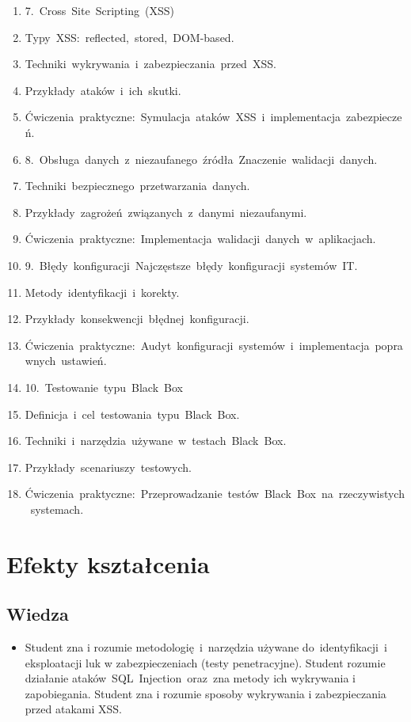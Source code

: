\documentclass[12pt, a4paper]{article}
\begin{document}
\begin{enumerate}
  \item 7. Cross Site Scripting (XSS)
  \item Typy XSS: reflected, stored, DOM-based.
  \item Techniki wykrywania i zabezpieczania przed XSS.
  \item Przykłady ataków i ich skutki.
  \item Ćwiczenia praktyczne: Symulacja ataków XSS i implementacja zabezpieczeń.
  \item 8. Obsługa danych z niezaufanego źródła Znaczenie walidacji danych.
  \item Techniki bezpiecznego przetwarzania danych.
  \item Przykłady zagrożeń związanych z danymi niezaufanymi.
  \item Ćwiczenia praktyczne: Implementacja walidacji danych w aplikacjach.
  \item 9. Błędy konfiguracji Najczęstsze błędy konfiguracji systemów IT.
  \item Metody identyfikacji i korekty.
  \item Przykłady konsekwencji błędnej konfiguracji.
  \item Ćwiczenia praktyczne: Audyt konfiguracji systemów i implementacja poprawnych ustawień.
  \item 10. Testowanie typu Black Box
  \item Definicja i cel testowania typu Black Box.
  \item Techniki i narzędzia używane w testach Black Box.
  \item Przykłady scenariuszy testowych.
  \item Ćwiczenia praktyczne: Przeprowadzanie testów Black Box na rzeczywistych systemach.
\end{enumerate}

\section{Efekty kształcenia}

\subsection*{Wiedza}
\begin{itemize}
  \item Student zna i rozumie metodologię i narzędzia używane do identyfikacji i eksploatacji luk w zabezpieczeniach (testy penetracyjne). Student rozumie działanie  ataków SQL Injection oraz zna metody ich wykrywania i zapobiegania. Student zna i rozumie sposoby wykrywania i zabezpieczania przed atakami XSS.
\end{itemize}
\end{document}
